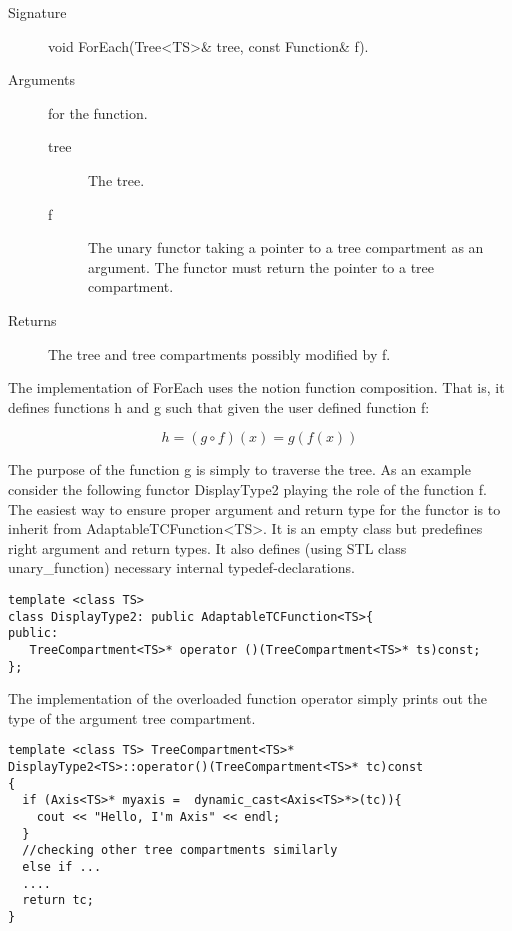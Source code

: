 \begin{description}
    \item [Signature] void ForEach(Tree<TS>\& tree, const Function\& f).
    \item [Arguments] for the function.
      \begin{description}
        \item [tree] The tree.
        \item [f]  The unary   functor  taking a   pointer to a   tree
      compartment as an argument. The functor  must return the pointer
      to a tree compartment.
     \end{description} 
   \item[Returns] The tree and tree compartments possibly modified by f.
\end{description} 

The implementation of ForEach uses   the notion function  composition.
That is, it defines functions h and g such that given the user defined
function f:

\begin{displaymath}
h = (g \circ f)(x) = g(f(x))
\end{displaymath}

The purpose of  the function g is simply to traverse  the tree.  As an
example consider  the following functor DisplayType2  playing the role
of  the function  f. The  easiest way  to ensure  proper  argument and
return    type    for    the    functor    is    to    inherit    from
AdaptableTCFunction<TS>.  It  is an  empty class but  predefines right
argument  and   return  types.  It  also  defines   (using  STL  class
unary\_function) necessary internal typedef-declarations.

\begin{verbatim}
template <class TS>
class DisplayType2: public AdaptableTCFunction<TS>{
public:
   TreeCompartment<TS>* operator ()(TreeCompartment<TS>* ts)const;
};
\end{verbatim}

The  implementation  of  the  overloaded function  operator  simply
prints out the type of the argument tree compartment.

\begin{verbatim}
template <class TS> TreeCompartment<TS>* 
DisplayType2<TS>::operator()(TreeCompartment<TS>* tc)const
{
  if (Axis<TS>* myaxis =  dynamic_cast<Axis<TS>*>(tc)){
    cout << "Hello, I'm Axis" << endl;
  }
  //checking other tree compartments similarly
  else if ...  
  ....
  return tc;
}
\end{verbatim}

